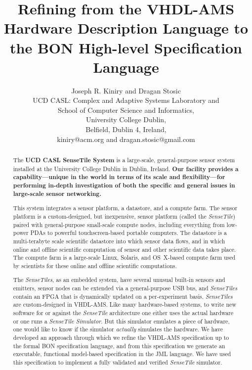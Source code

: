 \documentclass{article}
\newcommand{\ST}{\emph{SenseTile}\xspace}
\newcommand{\STs}{\emph{SenseTiles}\xspace}
\newcommand{\STS}{\emph{SenseTile Simulator}\xspace}
\begin{document}
\title{Refining from the VHDL-AMS Hardware Description Language 
to the BON High-level Specification Language}

\author{Joseph R. Kiniry and Dragan Stosic\\
UCD CASL: Complex and Adaptive Systems Laboratory and\\
School of Computer Science and Informatics,\\
University College Dublin,\\
Belfield, Dublin 4, Ireland,\\
kiniry@acm.org and dragan.stosic@gmail.com\\
}

\maketitle

\begin{abstract}

The \textbf{UCD CASL SenseTile System} is a large-scale,
general-purpose sensor system installed at the University College
Dublin in Dublin, Ireland.  \textbf{Our facility provides a
capability---unique in the world in terms of its scale and
flexibility---for performing in-depth investigation of both the
specific and general issues in large-scale sensor networking.}

This system integrates a sensor platform, a datastore, and a compute
farm.  The sensor platform is a custom-designed, but inexpensive,
sensor platform (called the \ST) paired with general-purpose
small-scale compute nodes, including everything from low-power PDAs to
powerful touchscreen-based portable computers.  The datastore is a
multi-terabyte scale scientific datastore into which sensor data
flows, and in which online and offline scientific computation of
sensor and other scientific data takes place.  The compute farm is a
large-scale Linux, Solaris, and OS~X-based compute farm used by
scientists for these online and offline scientific computations.

The \STs, as an embedded system, have several unusual built-in sensors
and emitters, sensor nodes can be extended via a general-purpose USB
bus, and \STs contain an FPGA that is dynamically updated on a
per-experiment basis.  \STs are custom-designed in VHDL-AMS.  Like
many hardware-based systems, to write new software for or against the
\ST architecture one either uses the actual hardware or one runs a
\STS.  But this simulator emulates a piece of hardware, one would like
to know if the simulator \emph{actually} simulates the hardware.  We
have developed an approach through which we refine the VHDL-AMS
specification up to the formal BON specification language, and from
this specification we generate an executable, functional model-based
specification in the JML language.  We have used this specification to
implement a fully validated and verified \ST simulator.

\end{abstract}
\end{document}

